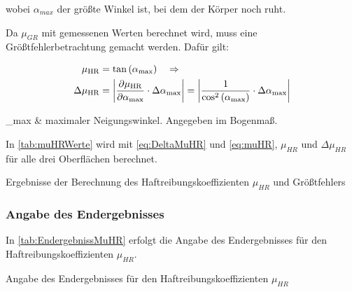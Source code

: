 wobei $\alpha_{max}$ der größte Winkel ist, bei dem der Körper noch ruht.\newline

\newpage

Da $\mu_{GR}$ mit gemessenen Werten berechnet wird, muss eine Größtfehlerbetrachtung gemacht werden. Dafür gilt:


\begin{align}
\mu_{\mathrm{HR}} &=\tan \left(\alpha_{\max }\right) \quad \Rightarrow \nonumber \\
\Delta \mu_{\mathrm{HR}}&=\left|\frac{\partial \mu_{\mathrm{HR}}}{\partial \alpha_{\max }} \cdot \Delta \alpha_{\max }\right|=\abs*{\frac{1}{\cos ^{2}\left(\alpha_{\max }\right)} \cdot \Delta \alpha_{\max }} \label{eq:DeltaMuHR}
\end{align}
\begin{conditions}
\alpha_{max} & maximaler Neigungswinkel. Angegeben im Bogenmaß.
\end{conditions}

In \autoref{tab:muHRWerte} wird mit \autoref{eq:DeltaMuHR} und \autoref{eq:muHR}, $\mu_{HR}$ und $\Delta \mu_{HR}$ für alle drei Oberflächen berechnet.

\begin{table}[h]
  \center 
  \caption[Haftreibungskoeffizienten und Größtfehler]{Ergebnisse der Berechnung des Haftreibungskoeffizienten $\mu_{HR}$ und Größtfehlers}
  
  \label{tab:muHRWerte}
\end{table}

\subsubsection{Angabe des Endergebnisses}

In \autoref{tab:EndergebnissMuHR} erfolgt die Angabe des Endergebnisses für den Haftreibungskoeffizienten $\mu_{HR}$.

\begin{table}[h]
  \center 
  \caption[Endergebnisse des Haftreibungskoeffizienten]{Angabe des Endergebnisses für den Haftreibungskoeffizienten $\mu_{HR}$}
  
  \label{tab:EndergebnissMuHR}
\end{table}